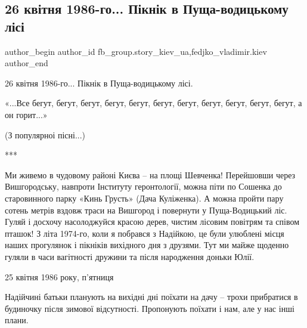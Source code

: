  
 
 
 
 
 
\subsection{26 квітня 1986-го... Пікнік в Пуща-водицькому лісі}
\label{sec:30_11_2021.fb.fb_group.story_kiev_ua.1.chaes_piknik_puscha_vodica}
 
\ifcmt
 author_begin
   author_id fb_group.story_kiev_ua,fedjko_vladimir.kiev
 author_end
\fi

26 квітня 1986-го... Пікнік в Пуща-водицькому лісі.

«...Все бегут, бегут, бегут, бегут, бегут, бегут, бегут, бегут, бегут, бегут, бегут, 
а он горит...»

(З популярноі пісні...)

***

Ми живемо в чудовому районі Києва – на площі Шевченка! Перейшовши через
Вишгородську, навпроти Інституту геронтології, можна піти по Сошенка до
старовинного парку «Кинь Грусть» (Дача Куліженка). А можна пройти пару сотень
метрів вздовж траси на Вишгород і повернути у Пуща-Водицький ліс. Гуляй і
досхочу насолоджуйся красою дерев, чистим лісовим повітрям та співом пташок! З
літа 1974-го, коли я побрався з Надійкою, це були улюблені місця наших
прогулянок і пікніків вихідного дня з друзями. Тут ми майже щоденно гуляли в
часи вагітності дружини та після народження доньки Юлії. 


25 квітня 1986 року, п’ятниця

Надійчині батьки планують на вихідні дні поїхати на дачу – трохи прибратися в
будиночку після зимової відсутності. Пропонують поїхати і нам, але у нас інші
плани.  


